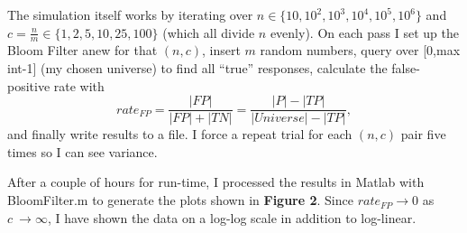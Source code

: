 \documentclass[]{article}
\begin{document}
  The simulation itself works by iterating over $n \in \{10, 10^{2}, 10^{3}, 10^{4}, 10^{5}, 10^{6}\}$ and $c = \frac{n}{m} \in \{1, 2, 5, 10, 25, 100\}$ (which all divide $n$ evenly). On each pass I set up the Bloom Filter anew for that $(n,c)$, insert $m$ random numbers, query over [0,max int-1] (my chosen universe) to find all ``true'' responses, calculate the false-positive rate with
  $$rate_{FP} = \frac{|FP|}{|FP|+|TN|} = \frac{|P|-|TP|}{|Universe|-|TP|},$$
  and finally write results to a file. I force a repeat trial for each $(n,c)$ pair five times so I can see variance.

  After a couple of hours for run-time, I processed the results in Matlab with BloomFilter.m to generate the plots shown in \textbf{Figure 2}. Since $rate_{FP} \rightarrow 0$ as $c\ \rightarrow \infty$, I have shown the data on a log-log scale in addition to log-linear.
  
\end{document}
